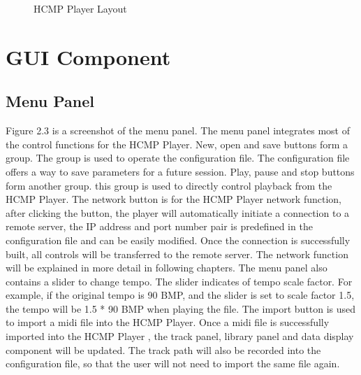 \begin{figure}[H]
\caption{HCMP Player Layout}
\label{fig:speciation}
\end{figure}

\section{GUI Component}

\subsection{Menu Panel}

Figure 2.3 is a screenshot of the menu panel. The menu panel integrates most of the control 
functions for the HCMP Player. New, open and save buttons form a group. The group is used to 
operate the configuration file. The configuration file offers a way to save parameters for a
future session. Play, pause and stop buttons form another group. 
this group is used to directly control playback from the HCMP Player.
The network button is for the HCMP Player  
network function, after clicking the button, the player will automatically 
initiate a connection to a remote server, the IP address and port number pair is 
predefined in the configuration file and can be easily modified. Once the connection is 
successfully built, all controls will be transferred to the remote server. 
The network function will be explained in more detail in following
chapters. The menu panel also contains a slider to change 
tempo. The slider indicates of tempo scale factor. For example, 
if the original tempo is 90 BMP, and the slider is set to scale factor 1.5, 
the tempo will be 1.5 * 90 
BMP when playing the file. The import button is used to import a midi file 
into the HCMP Player. Once a midi file is successfully imported into the HCMP Player  
, the track panel, library panel and data display component will be updated.
The track path will also be recorded into the configuration file, so that the user 
will not need to import the same file again.

